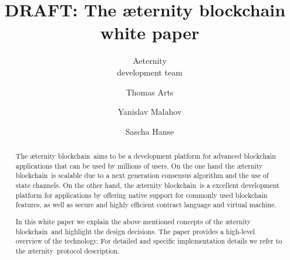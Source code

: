 \documentclass{article}
\newcommand{\blockchain}{{\ae}ternity blockchain}
\newcommand{\aet}{{\ae}ternity}
\begin{document}
\title{DRAFT: The \blockchain\ \\white paper}

\author{Aeternity\\development team  \and Thomas Arts \and
             Yanislav Malahov \and Sascha Hanse}

\maketitle

%
\begin{abstract}
The \blockchain\ aims to be a development platform for advanced blockchain
applications that can be used by millions of users.
On the one hand the \blockchain\ is scalable due to a next generation
consensus algorithm and the use of state channels. On the other hand,
the \blockchain\ is a excellent development platform for
applications by offering native support for commonly used
blockchain features, as well as secure and highly efficient
contract language and virtual machine.

In this white paper we explain the above mentioned concepts of the
\blockchain\ and highlight the design decisions. The
paper provides a high-level overview of the technology. For detailed
and specific implementation details we refer to the \aet\ protocol
description.

\end{abstract}


\newpage

\tableofcontents

\newpage







%

 
\end{document}

